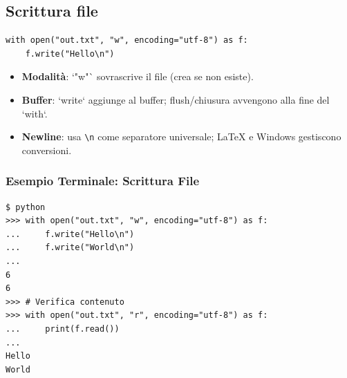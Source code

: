 \subsection{Scrittura file}
\begin{lstlisting}
with open("out.txt", "w", encoding="utf-8") as f:
    f.write("Hello\n")
\end{lstlisting}
\begin{tcolorbox}[title=Spiegazione del codice]
\begin{itemize}
  \item \textbf{Modalità}: `"w"` sovrascrive il file (crea se non esiste).
  \item \textbf{Buffer}: `write` aggiunge al buffer; flush/chiusura avvengono alla fine del `with`.
  \item \textbf{Newline}: usa \verb|\n| come separatore universale; LaTeX e Windows gestiscono conversioni.
\end{itemize}
\end{tcolorbox}

\subsubsection{Esempio Terminale: Scrittura File}
\begin{tcolorbox}[title={\faTerminal\ Output}, colback=black!5, colframe=black!70]
\begin{lstlisting}[style=python]
$ python
>>> with open("out.txt", "w", encoding="utf-8") as f:
...     f.write("Hello\n")
...     f.write("World\n")
...
6
6
>>> # Verifica contenuto
>>> with open("out.txt", "r", encoding="utf-8") as f:
...     print(f.read())
...
Hello
World
\end{lstlisting}
\end{tcolorbox}


